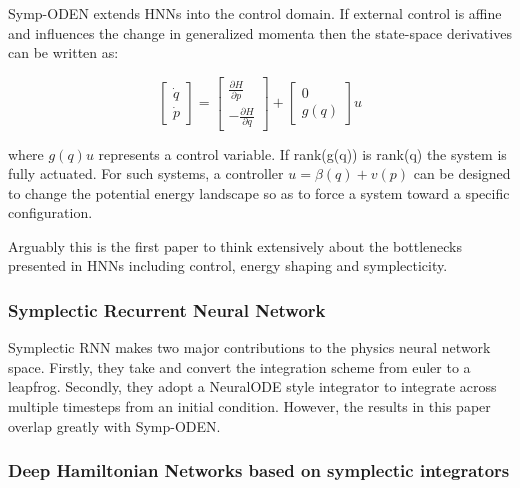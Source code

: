 \documentclass{article}
\begin{document}
Symp-ODEN \cite{zhong_symplectic_2019} extends HNNs into the control domain. If external control is affine and influences the change in generalized momenta then the state-space derivatives can be written as:

\begin{equation}
\begin{bmatrix}
\dot{q} \\
\dot{p}
\end{bmatrix}
= 
\begin{bmatrix}
\frac{\partial H}{\partial p} \\
-\frac{\partial H}{\partial q}
\end{bmatrix}
+
\begin{bmatrix}
0 \\
g(q)
\end{bmatrix} u
\end{equation}

where $g(q)u$ represents a control variable. If rank(g(q)) is rank(q) the system is fully actuated. For such systems, a controller $u = \beta(q) +v(p) $ can be designed to change the potential energy landscape so as to force a system toward a specific configuration.

%

Arguably this is the first paper to think extensively about the bottlenecks presented in HNNs including control, energy shaping and symplecticity. 



\subsubsection{Symplectic Recurrent Neural Network}

Symplectic RNN \cite{chen_symplectic_2020} makes two major contributions to the physics neural network space. Firstly, they take  and convert the integration scheme from euler to a leapfrog. Secondly, they adopt a NeuralODE style integrator to integrate across multiple timesteps from an initial condition. However, the results in this paper overlap greatly with Symp-ODEN. 

\subsubsection{Deep Hamiltonian Networks based on symplectic integrators}
\end{document}
